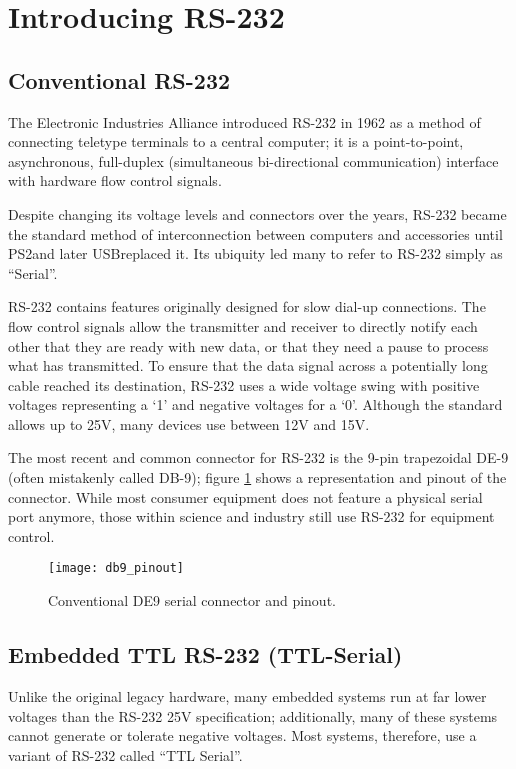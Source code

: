 \documentclass[openany,11pt,fleqn]{book} %
\begin{document}
\section{Introducing RS-232}
\subsection{Conventional RS-232}
The Electronic Industries Alliance introduced RS-232 in 1962 as a method of connecting teletype terminals to a central computer; it is a point-to-point, asynchronous, full-duplex (simultaneous bi-directional communication) interface with hardware flow control signals. 

Despite changing its voltage levels and connectors over the years, RS-232 became the standard method of interconnection between computers and accessories until PS2\textemdash and later USB\textemdash replaced it. Its ubiquity led many to refer to RS-232 simply as ``Serial''. 

RS-232 contains features originally designed for slow dial-up connections. The flow control signals allow the transmitter and receiver to directly notify each other that they are ready with new data, or that they need a pause to process what has transmitted. To ensure that the data signal across a potentially long cable reached its destination, RS-232 uses a wide voltage swing with positive voltages representing a `1' and negative voltages for a `0'. Although the standard allows up to {\textpm}25V, many devices use between {\textpm}12V and {\textpm}15V.

The most recent and common connector for RS-232 is the 9-pin trapezoidal DE-9 (often mistakenly called DB-9); figure \ref{db9_pinout} shows a representation and pinout of the connector. While most consumer equipment does not feature a physical serial port anymore, those within science and industry still use RS-232 for equipment control.  


\begin{figure}[]
    \centering\texttt{[image: db9\_pinout]}
    \caption{Conventional DE9 serial connector and pinout.}
    \label{db9_pinout}
\end{figure} 

\subsection{Embedded TTL RS-232 (TTL-Serial)}
Unlike the original legacy hardware, many embedded systems run at far lower voltages than the  RS-232 {\textpm}25V specification; additionally, many of these systems cannot generate or tolerate negative voltages. Most systems, therefore, use a variant of RS-232 called ``TTL Serial''.
\end{document}
